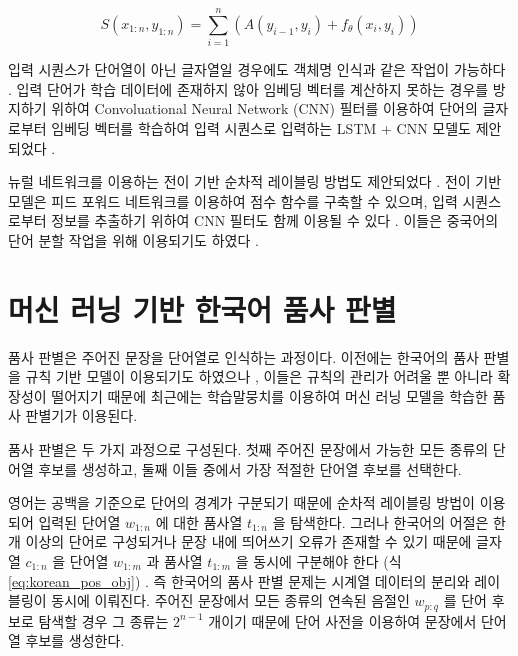 \documentclass[oneside, ko,phd]{snuthesis_utf8_kor}
\begin{document}
\begin{equation}
  \label{eq:rnn_crf_score}
  S(x_{1:n}, y_{1:n}) = \sum_{i=1}^n \left( A(y_{i-1}, y_i) + f_\theta(x_i, y_i) \right)
\end{equation}

입력 시퀀스가 단어열이 아닌 글자열일 경우에도 객체명 인식과 같은 작업이 가능하다 \cite{gridach2017character}.
입력 단어가 학습 데이터에 존재하지 않아 임베딩 벡터를 계산하지 못하는 경우를 방지하기 위하여 Convoluational Neural Network (CNN) 필터를 이용하여 단어의 글자로부터 임베딩 벡터를 학습하여 입력 시퀀스로 입력하는 LSTM + CNN 모델도 제안되었다 \cite{chiu2016named}.

뉴럴 네트워크를 이용하는 전이 기반 순차적 레이블링 방법도 제안되었다 \cite{zheng2013deep, collobert2011natural, alberti2015improved}.
전이 기반 모델은 피드 포워드 네트워크를 이용하여 점수 함수를 구축할 수 있으며, 입력 시퀀스로부터 정보를 추출하기 위하여 CNN 필터도 함께 이용될 수 있다 \cite{collobert2011natural}.
이들은 중국어의 단어 분할 작업을 위해 이용되기도 하였다 \cite{zhang2016transition, cai2017fast, ballesteros2015improved}.

\section{머신 러닝 기반 한국어 품사 판별}

품사 판별은 주어진 문장을 단어열로 인식하는 과정이다.
이전에는 한국어의 품사 판별을 규칙 기반 모델이 이용되기도 하였으나 \cite{yang2000part, choi1993bidirectional}, 이들은 규칙의 관리가 어려울 뿐 아니라 확장성이 떨어지기 때문에 최근에는 학습말뭉치를 이용하여 머신 러닝 모델을 학습한 품사 판별기가 이용된다.

품사 판별은 두 가지 과정으로 구성된다.
첫째 주어진 문장에서 가능한 모든 종류의 단어열 후보를 생성하고, 둘째 이들 중에서 가장 적절한 단어열 후보를 선택한다.

영어는 공백을 기준으로 단어의 경계가 구분되기 때문에 순차적 레이블링 방법이 이용되어 입력된 단어열 $w_{1:n}$ 에 대한 품사열 $t_{1:n}$ 을 탐색한다.
그러나 한국어의 어절은 한 개 이상의 단어로 구성되거나 문장 내에 띄어쓰기 오류가 존재할 수 있기 때문에 글자열 $c_{1:n}$ 을 단어열 $w_{1:m}$ 과 품사열 $t_{1:m}$ 을 동시에 구분해야 한다 (식 \ref{eq:korean_pos_obj}) \cite{lee2011koreanpos}.
즉 한국어의 품사 판별 문제는 시계열 데이터의 분리와 레이블링이 동시에 이뤄진다.
주어진 문장에서 모든 종류의 연속된 음절인 $w_{p:q}$ 를 단어 후보로 탐색할 경우 그 종류는 $2^{n-1}$ 개이기 때문에 단어 사전을 이용하여 문장에서 단어열 후보를 생성한다.
\end{document}
